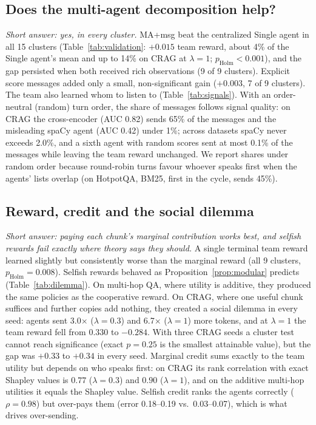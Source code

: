 \documentclass[sigconf,anonymous]{aamas}
\theoremstyle{plain}
\theoremstyle{definition}
\begin{document}
\subsection{Does the multi-agent decomposition help?}

\emph{Short answer: yes, in every cluster.} MA+msg beat the centralized Single agent in all 15 clusters (Table~\ref{tab:validation}: $+0.015$ team reward, about 4\% of the Single agent's mean and up to 14\% on CRAG at $\lambda=1$; $p_{\mathrm{Holm}}<0.001$), and the gap persisted when both received rich observations (9 of 9 clusters). Explicit score messages added only a small, non-significant gain ($+0.003$, 7 of 9 clusters). The team also learned whom to listen to (Table~\ref{tab:signals}). With an order-neutral (random) turn order, the share of messages follows signal quality: on CRAG the cross-encoder (AUC 0.82) sends 65\% of the messages and the misleading spaCy agent (AUC 0.42) under 1\%; across datasets spaCy never exceeds 2.0\%, and a sixth agent with random scores sent at most 0.1\% of the messages while leaving the team reward unchanged. We report shares under random order because round-robin turns favour whoever speaks first when the agents' lists overlap (on HotpotQA, BM25, first in the cycle, sends 45\%).



\subsection{Reward, credit and the social dilemma}

\emph{Short answer: paying each chunk's marginal contribution works best, and selfish rewards fail exactly where theory says they should.} A single terminal team reward learned slightly but consistently worse than the marginal reward (all 9 clusters, $p_{\mathrm{Holm}}=0.008$). Selfish rewards behaved as Proposition~\ref{prop:modular} predicts (Table~\ref{tab:dilemma}). On multi-hop QA, where utility is additive, they produced the same policies as the cooperative reward. On CRAG, where one useful chunk suffices and further copies add nothing, they created a social dilemma in every seed: agents sent 3.0$\times$ ($\lambda=0.3$) and 6.7$\times$ ($\lambda=1$) more tokens, and at $\lambda=1$ the team reward fell from $0.330$ to $-0.284$. With three CRAG seeds a cluster test cannot reach significance (exact $p=0.25$ is the smallest attainable value), but the gap was $+0.33$ to $+0.34$ in every seed. Marginal credit sums exactly to the team utility but depends on who speaks first: on CRAG its rank correlation with exact Shapley values is $0.77$ ($\lambda=0.3$) and $0.90$ ($\lambda=1$), and on the additive multi-hop utilities it equals the Shapley value. Selfish credit ranks the agents correctly ($\rho=0.98$) but over-pays them (error 0.18--0.19 vs.\ 0.03--0.07), which is what drives over-sending.
\end{document}
